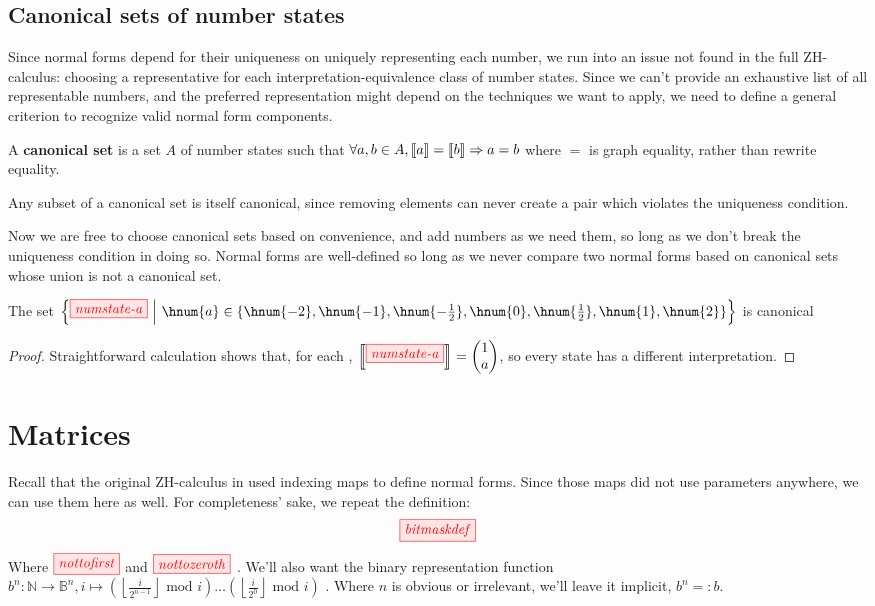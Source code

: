 \subsection{Canonical sets of number states}\label{sec:canonsets}
Since normal forms depend for their uniqueness on uniquely representing each
number, we run into an issue not found in the full ZH-calculus: choosing a
representative for each interpretation-equivalence class of number states. Since
we can't provide an exhaustive list of all representable numbers, and the
preferred representation might depend on the techniques we want to apply, we
need to define a general criterion to recognize valid normal form components.
\begin{definition}
    A \textbf{canonical set} is a set $A$ of number states such that $\forall a,
    b \in A, \left\llbracket a \right\rrbracket = \left\llbracket b \right\rrbracket \Rightarrow a = b$ where $=$ is graph equality,
    rather than rewrite equality.
\end{definition}
\begin{remark}
    Any subset of a canonical set is itself canonical, since removing elements
    can never create a pair which violates the uniqueness condition.
\end{remark}

Now we are free to choose canonical sets based on convenience, and add numbers
as we need them, so long as we don't break the uniqueness condition in doing so.
Normal forms are well-defined so long as we never compare two normal forms based
on canonical sets whose union is not a canonical set.

\begin{lemma}\label{lem:canoncanon}
    The set $\left\{\tikzfig{numstate-a}\ \middle|\ \hnum{a} \in \{\hnum{-2}, \hnum{-1}, \hnum{-\frac{1}{2}}, \hnum{0},
    \hnum{\frac{1}{2}}, \hnum{1}, \hnum{2}\}\right\}$ is canonical
\end{lemma}
\begin{proof}
    Straightforward calculation shows that, for each ,
    $\intf{\tikzfig{numstate-a}} =
    \begin{pmatrix}
        1 \\
        a
    \end{pmatrix}$, so every state has a different interpretation.
\end{proof}




\section{Matrices}\label{sec:matrices}
Recall that the original ZH-calculus in \cite{backens2018zhcalculus} used
indexing maps to define normal forms.  Since those maps did not use parameters
anywhere, we can use them here as well.  For completeness' sake, we repeat the
definition:
$$\tikzfig{bitmaskdef}$$
Where $\tikzfig{nottofirst}$ and $\tikzfig{nottozeroth}$ . We'll also want the
binary representation function 
$b^n : \mathbb{N} \rightarrow \mathbb{B}^n, i \mapsto \left( \left \lfloor
\frac{i}{2^{n-1}}\right \rfloor \text{ mod } i \right) \ldots \left( \left \lfloor
\frac{i}{2^{0}}\right \rfloor \text{ mod } i \right)$ . Where $n$ is obvious or
irrelevant, we'll leave it implicit, $b^n =: b$.

